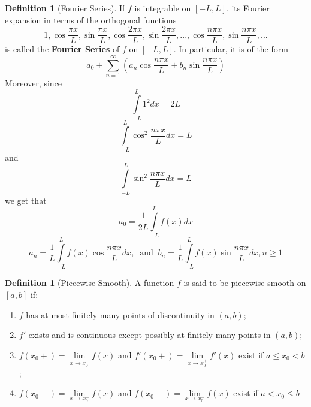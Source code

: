 \documentclass[12pt]{article}
\theoremstyle{definition}
\newtheorem{defn}[thm]{Definition}
\theoremstyle{remark}
\numberwithin{equation}{section}
\newcommand\B[1]{\textbf{ #1}}
\begin{document}
\begin{defn}[Fourier Series]
        If $f$ is integrable on $[-L,L]$, its Fourier expansion in terms of the orthogonal functions \begin{equation}
                1, \cos\frac{\pi x}{L}, \sin\frac{\pi x}{L},\cos\frac{2\pi x}{L},\sin\frac{2\pi x}{L},...,\cos\frac{n\pi x}{L},\sin\frac{n\pi x}{L},...
        \end{equation}
        is called the \B{Fourier Series} of $f$ on $[-L,L]$. In particular, it is of the form \begin{equation}
                a_0 + \sum\limits_{n=1}^{\infty}\left(a_n\cos\frac{n\pi x}{L}+b_n\sin\frac{n\pi x}{L}\right)
        \end{equation}
        Moreover, since \begin{equation*}
                \int\limits_{-L}^L1^2dx = 2L
        \end{equation*}
        \begin{equation*}
                \int\limits_{-L}^L\cos^2\frac{n\pi x}{L}dx = L
        \end{equation*}
        and \begin{equation*}
                \int\limits_{-L}^L\sin^2\frac{n\pi x}{L}dx = L
        \end{equation*}
        we get that \begin{equation}
                a_0 = \frac{1}{2L}\int\limits_{-L}^Lf(x)dx
        \end{equation}
        \begin{equation}
                a_n = \frac{1}{L}\int\limits_{-L}^Lf(x)\cos\frac{n\pi x}{L}dx,\;\;\text{and}\;\;b_n = \frac{1}{L}\int\limits_{-L}^Lf(x)\sin\frac{n\pi x}{L}dx, n \geq 1
        \end{equation}
\end{defn}


\vspace{1cm}


\begin{defn}[Piecewise Smooth]
        A function $f$ is said to be piecewise smooth on $[a,b]$ if:\begin{enumerate}
                \item $f$ has at most finitely many points of discontinuity in $(a,b)$;
                \item $f'$ exists and is continuous except possibly at finitely many points in $(a,b)$;
                \item $f(x_0+)=\lim\limits_{x\rightarrow x_0^+}f(x)$ and $f'(x_0+)=\lim\limits_{x\rightarrow x_0^+}f'(x)$ exist if $a \leq x_0 < b$;
                \item $f(x_0-)=\lim\limits_{x\rightarrow x_0^-}f(x)$ and $f(x_0-)=\lim\limits_{x\rightarrow x_0^-}f(x)$ exist if $a < x_0 \leq b$
        \end{enumerate}
\end{defn}
\end{document}
